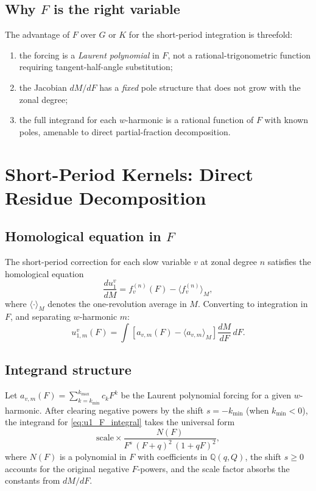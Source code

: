 \documentclass[11pt]{article}
\begin{document}
\subsection{Why $F$ is the right variable}

The advantage of $F$ over $G$ or $K$ for the short-period integration is
threefold:
\begin{enumerate}
    \item the forcing is a \emph{Laurent polynomial} in $F$, not a
    rational-trigonometric function requiring tangent-half-angle substitution;
    \item the Jacobian $dM/dF$ has a \emph{fixed} pole structure that does not
    grow with the zonal degree;
    \item the full integrand for each $w$-harmonic is a rational function of
    $F$ with known poles, amenable to direct partial-fraction decomposition.
\end{enumerate}

\section{Short-Period Kernels: Direct Residue Decomposition}
\label{sec:residue}

\subsection{Homological equation in $F$}

The short-period correction for each slow variable $v$ at zonal degree $n$
satisfies the homological equation
\begin{equation}
\frac{du_1^v}{dM}
= f^{(n)}_v(F) - \langle f^{(n)}_v \rangle_M,
\label{eq:homological_F}
\end{equation}
where $\langle \cdot \rangle_M$ denotes the one-revolution average in $M$.
Converting to integration in $F$, and separating $w$-harmonic $m$:
\begin{equation}
u_{1,m}^v(F)
= \int \left[a_{v,m}(F) - \langle a_{v,m} \rangle_M \right]
\frac{dM}{dF}\, dF.
\label{eq:u1_F_integral}
\end{equation}

\subsection{Integrand structure}

Let $a_{v,m}(F) = \sum_{k=k_{\min}}^{k_{\max}} c_k F^k$ be the Laurent
polynomial forcing for a given $w$-harmonic. After clearing negative powers
by the shift $s = -k_{\min}$ (when $k_{\min} < 0$), the integrand for
\eqref{eq:u1_F_integral} takes the universal form
\begin{equation}
\text{scale} \times
\frac{N(F)}{F^s\,(F+q)^2\,(1+qF)^2},
\label{eq:integrand_universal}
\end{equation}
where $N(F)$ is a polynomial in $F$ with coefficients in $\mathbb{Q}(q, Q)$,
the shift $s \ge 0$ accounts for the original negative $F$-powers, and
the scale factor absorbs the constants from $dM/dF$.
\end{document}
